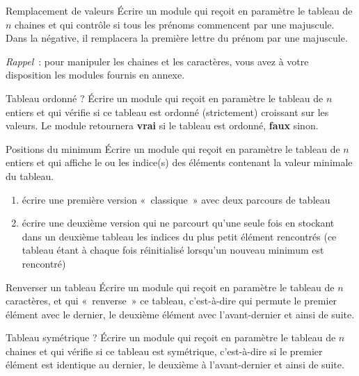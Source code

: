 \begin{Exercice}{Remplacement de valeurs}
	Écrire un module qui reçoit en paramètre le tableau
	 de $n$ chaines et qui
	contrôle si tous les prénoms commencent par une majuscule.
	Dans la négative, il remplacera la première lettre du prénom 
	par une majuscule.
	
	\textit{Rappel}~: pour manipuler les chaines et les caractères,
	vous avez à votre disposition les modules fournis en annexe.
\end{Exercice}

\begin{Exercice}{Tableau ordonné ?}
	Écrire un module qui reçoit en paramètre le tableau
	 de $n$ entiers et qui
	vérifie si ce tableau est ordonné (strictement) croissant sur les
	valeurs. Le module retournera \textbf{vrai} si le tableau est ordonné,
	\textbf{faux} sinon.
\end{Exercice}

\begin{Exercice}{Positions du minimum}
	Écrire un module qui reçoit en paramètre le tableau
	 de $n$ entiers et qui
	affiche le ou les indice(s) des éléments contenant la valeur minimale
	du tableau.

	\begin{enumerate}[label=\alph*)]
	\item 
		écrire une première version «~classique~» avec deux parcours de tableau
	\item
		écrire une deuxième version qui ne parcourt qu’une seule fois 
		 en
		stockant dans un deuxième tableau les indices du plus petit élément
		rencontrés (ce tableau étant à chaque fois réinitialisé lorsqu’un
		nouveau minimum est rencontré)
	\end{enumerate}
\end{Exercice}

\begin{Exercice}{Renverser un tableau}
	Écrire un module qui reçoit en paramètre le tableau
	 de $n$ caractères, et qui
	«~renverse~» ce tableau, c’est-à-dire qui permute le premier élément
	avec le dernier, le deuxième élément avec l’avant-dernier et ainsi de
	suite.
\end{Exercice}

\begin{Exercice}{Tableau symétrique ?}
	Écrire un module qui reçoit en paramètre le tableau
	 de $n$ chaines et qui
	vérifie si ce tableau est symétrique, c’est-à-dire si le premier
	élément est identique au dernier, le deuxième à l’avant-dernier et
	ainsi de suite.
\end{Exercice}


